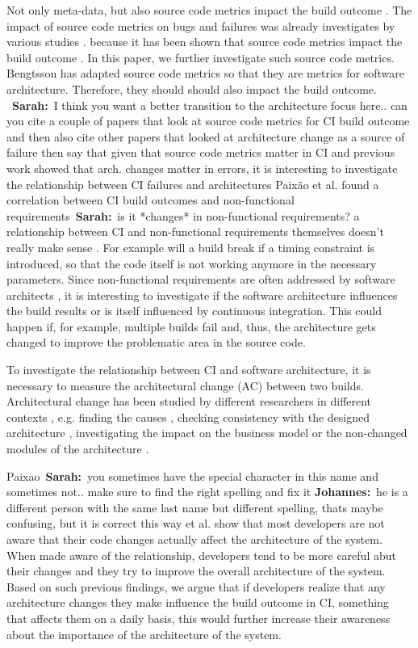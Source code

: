 \documentclass[sigplan, anonymous, review]{acmart}
\newcommand{\sn}[1]{{\color{blue}\textbf{Sarah:}~#1}}
\newcommand{\jk}[1]{{\color{violet}\textbf{Johannes:}~#1}}
\begin{document}
Not only meta-data, but also source code metrics impact the build outcome \cite{FailsCorr}. The impact of source code metrics on bugs and failures was already investigates by various studies \cite{MetricsSource1, MetricsSource2}. 
because it has been shown that source code metrics impact the build outcome \cite{FailsCorr}. 
In this paper, we further investigate such source code metrics. 
Bengtsson \cite{arc-metrics} has adapted source code metrics so that they are metrics for software architecture. Therefore, they should should also impact the build outcome. 
~\sn{I think you want a better transition to the architecture focus here.. can you cite a couple of papers that look at source code metrics for CI build outcome and then also cite other papers that looked at architecture change as a source of failure then say that given that source code metrics matter in CI and previous work showed that arch. changes matter in errors, it is interesting to investigate the relationship between CI failures and architecture}s  Paix\~{a}o et al. found a correlation between CI build outcomes and non-functional requirements~\sn{is it *changes* in non-functional requirements? a relationship between CI and non-functional requirements themselves doesn't really make sense} \cite{Fail-NFReq}. For example will a build break if a timing constraint is introduced, so that the code itself is not working anymore in the necessary parameters. Since non-functional requirements are often addressed by software architects \cite{NFR-Architects}, it is interesting to investigate if the software architecture influences the build results or is itself influenced by continuous integration. 
This could happen if, for example, multiple builds fail and, thus, the architecture gets changed to improve the problematic area in the source code.

To investigate the relationship between CI and software architecture, it is necessary to measure the architectural change (AC) between two builds. Architectural change has been studied by different researchers in different contexts \cite{Aramis,StructDist,Arc-MDSE,Arcade-Base} , e.g.  finding the causes \cite{AC-Causes}, checking consistency with the designed architecture \cite{ArcConf, ArcCons}, investigating the impact on the business model \cite{ArcChange-Business} or the non-changed modules of the architecture \cite{Knowledge-AC}. 

Paixao~\sn{you sometimes have the special character in this name and sometimes not.. make sure to find the right spelling and fix it} \jk{he is a different person with the same last name but different spelling, thats maybe confusing, but it is correct this way} et al. \cite{ImpactAwareness} show that most developers are not aware that their code changes actually affect the architecture of the system. When made aware of the relationship, developers tend to be more careful abut their changes and they try to improve the overall architecture of the system.
Based on such previous findings, we argue that if developers realize that any architecture changes they make influence the build outcome in CI, something that affects them on a daily basis, this would further increase their awareness about the importance of the architecture of the system.
\end{document}
